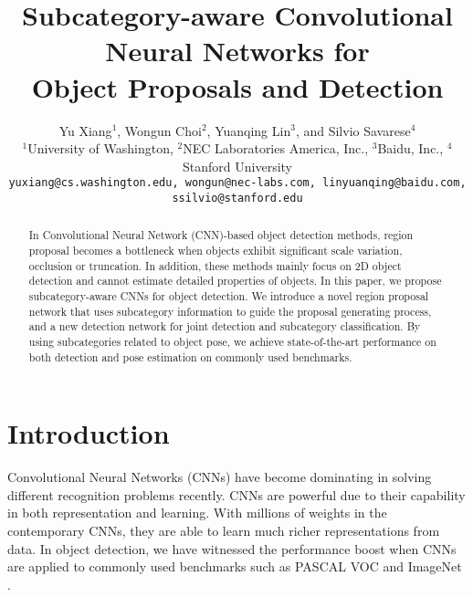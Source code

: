 \documentclass[10pt,twocolumn,letterpaper]{article}
\begin{document}
	
\title{Subcategory-aware Convolutional Neural Networks for \\ Object Proposals and Detection}



\author{Yu Xiang$^{1}$, Wongun Choi$^{2}$, Yuanqing Lin$^{3}$, and Silvio Savarese$^{4}$\\
	$^{1}$University of Washington,  $^{2}$NEC Laboratories America, Inc., $^{3}$Baidu, Inc., $^{4}$Stanford University \\
	{\tt\small yuxiang@cs.washington.edu, wongun@nec-labs.com, linyuanqing@baidu.com, ssilvio@stanford.edu}
}

\maketitle
\ifwacvfinal\thispagestyle{empty}\fi

\begin{abstract}
	
In Convolutional Neural Network (CNN)-based object detection methods, region proposal becomes a bottleneck when objects exhibit significant scale variation, occlusion or truncation. In addition, these methods mainly focus on 2D object detection and cannot estimate detailed properties of objects. In this paper, we propose subcategory-aware CNNs for object detection. We introduce a novel region proposal network that uses subcategory information to guide the proposal generating process, and a new detection network for joint detection and subcategory classification. By using subcategories related to object pose, we achieve state-of-the-art performance on both detection and pose estimation on commonly used benchmarks.

\end{abstract}

\vspace{-4mm}
\section{Introduction}

Convolutional Neural Networks (CNNs) have become dominating in solving different recognition problems recently. CNNs are powerful due to their capability in both representation and learning. With millions of weights in the contemporary CNNs, they are able to learn much richer representations from data. In object detection, we have witnessed the performance boost when CNNs \cite{krizhevsky2012imagenet,simonyan2014very} are applied to commonly used benchmarks such as PASCAL VOC \cite{pascal-voc-2012} and ImageNet \cite{ILSVRC15}.
\end{document}
